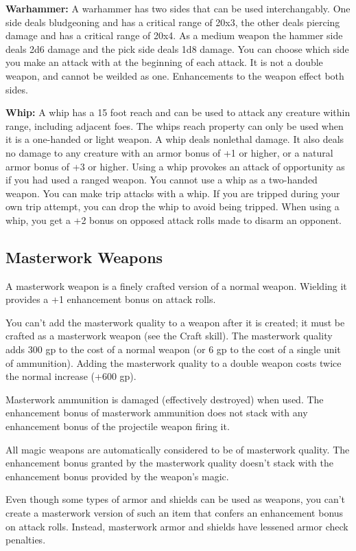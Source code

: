 \textbf{Warhammer:} A warhammer has two sides that can be used interchangably. One side deals bludgeoning and has a critical range of 20x3, the other deals piercing damage and has a critical range of 20x4. As a medium weapon the hammer side deals 2d6 damage and the pick side deals 1d8 damage. You can choose which side you make an attack with at the beginning of each attack. It is not a double weapon, and cannot be weilded as one. Enhancements to the weapon effect both sides.

\textbf{Whip:} A whip has a 15 foot reach and can be used to attack any creature within range, including adjacent foes. The whips reach property can only be used when it is a one-handed or light weapon. A whip deals nonlethal damage. It also deals no damage to any creature with an armor bonus of +1 or higher, or a natural armor bonus of +3 or higher. Using a whip provokes an attack of opportunity as if you had used a ranged weapon. You cannot use a whip as a two-handed weapon. You can make trip attacks with a whip. If you are tripped during your own trip attempt, you can drop the whip to avoid being tripped. When using a whip, you get a +2 bonus on opposed attack rolls made to disarm an opponent.

\subsection{Masterwork Weapons}

A masterwork weapon is a finely crafted version of a normal weapon. Wielding it 
provides a +1 enhancement bonus on attack rolls.

You can't add the masterwork quality to a weapon after it is created; it must be 
crafted as a masterwork weapon (see the Craft skill). The masterwork quality adds 
300 gp to the cost of a normal weapon (or 6 gp to the cost of a single unit of 
ammunition). Adding the masterwork quality to a double weapon costs twice the normal 
increase (+600 gp).

Masterwork ammunition is damaged (effectively destroyed) when used. The enhancement 
bonus of masterwork ammunition does not stack with any enhancement bonus of the 
projectile weapon firing it.

All magic weapons are automatically considered to be of masterwork quality. The 
enhancement bonus granted by the masterwork quality doesn't stack with the enhancement 
bonus provided by the weapon's magic.

Even though some types of armor and shields can be used as weapons, you can't create 
a masterwork version of such an item that confers an enhancement bonus on attack 
rolls. Instead, masterwork armor and shields have lessened armor check penalties.